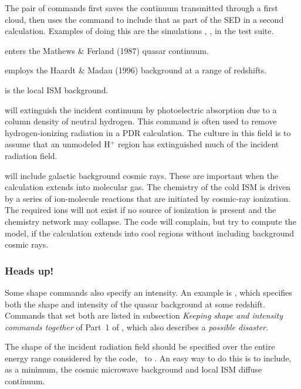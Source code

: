 \documentclass[12pt,twoside]{article}
\begin{document}
The  pair of commands
first saves the continuum transmitted through a first cloud, then uses the
 command to include that
as part of the SED in a second calculation.  Examples of doing this
are the simulations 
, ,
 in the test suite.  

 enters the Mathews \& Ferland (1987) quasar continuum.

 employs the Haardt
\& Madau (1996) background at a range of redshifts.

 is the local ISM background.

 \label{command:extinguish}will extinguish
the incident continuum by photoelectric
absorption due to a column density of neutral hydrogen.  This command is
often used to remove hydrogen-ionizing radiation in a PDR calculation.
The culture in this field is to assume that an unmodeled H$^+$ region has extinguished much of the incident radiation field.

 will include
galactic background cosmic rays.
These are important when the calculation extends into molecular gas.  The
chemistry of the cold ISM is driven by a series of ion-molecule reactions
that are initiated by cosmic-ray ionization.  The required ions will not
exist if no source of ionization is present and the chemistry network may
collapse.  The code will complain, but try to compute the model, if the
calculation extends into cool regions without including background cosmic
rays.

\subsubsection{Heads up!}

Some shape commands also specify
an intensity.  An example is , which
specifies both the shape and intensity of the quasar
background at some redshift. Commands that set both are listed in subsection
\emph{Keeping shape and intensity commands together}
of Part~1 of \Hazy, which also
describes a \emph{possible disaster.}

The shape of the incident radiation field
should be specified over the entire
energy range considered by the code, \emm\ to \egamrymev.   An easy way to do
this is to include, as a minimum, the cosmic microwave background and local
ISM diffuse continuum.
\end{document}
